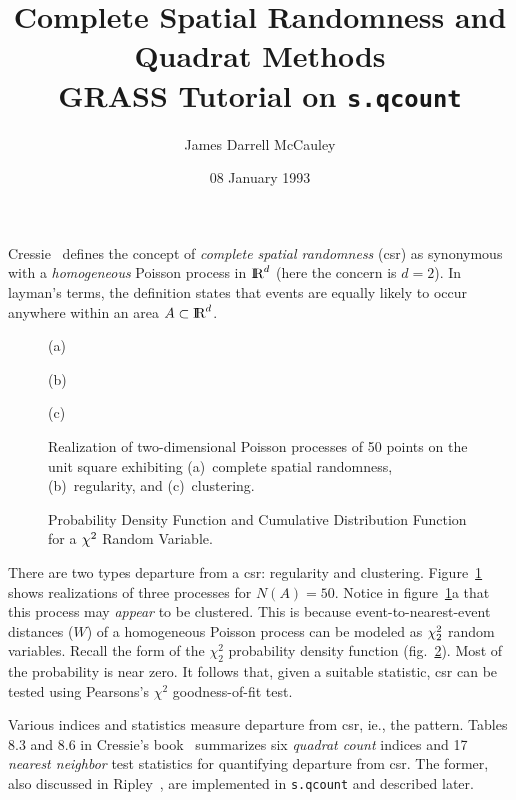 \title{Complete Spatial Randomness and Quadrat Methods\\ 
{\large GRASS Tutorial on {\tt s.qcount}}}
\author{James Darrell McCauley}
\date{08 January 1993}
\newcommand{\RR}{\mbox{\protect\makebox[.15em][l]{I}R}}


\maketitle
Cressie~\cite{cressie91} defines the concept of {\em
complete spatial randomness\/} (csr) as synonymous
with a {\em homogeneous\/} Poisson process in
$\RR^d\/$ (here the concern is $d=2$). In layman's
terms, the definition states that events are equally
likely to occur anywhere within an area
$A\subset\RR^d$.

\begin{figure}[h]
\begin{center}

\centerline{(a)}

\centerline{(b)}

\centerline{(c)}
\end{center}
\caption{Realization of two-dimensional Poisson processes of 50
points on the unit square exhibiting (a)~complete
spatial randomness, (b)~regularity, and (c)~clustering.}
\label{fig:csr}
\end{figure}

\begin{figure}[h]
\begin{center}

\end{center}
\caption{Probability Density Function and Cumulative Distribution
Function for a $\chi^2\/$ Random Variable.}
\label{fig:chisq}
\end{figure}

There are two types departure from a csr: regularity
and clustering.  Figure~\ref{fig:csr} shows
realizations of three processes for $N\left(A\right) =
50.$ Notice in figure~\ref{fig:csr}a that this
process may {\em appear\/} to be clustered.
This is because event-to-nearest-event distances ($W$) of
a homogeneous Poisson process can be modeled
as $\chi_2^2\/$ random variables. Recall the form of
the $\chi_2^2$ probability density function
(fig.~\ref{fig:chisq}). Most of the probability
is near zero. It follows that, given a suitable statistic,
csr can be tested using Pearsons's $\chi^2$ goodness-of-fit test.

Various indices and statistics
measure departure from csr, ie., the pattern.
Tables 8.3 and 8.6 in
Cressie's book~\cite{cressie91} summarizes six {\em
quadrat count\/} indices and 17 {\em nearest
neighbor\/} test statistics for quantifying
departure from csr.   The former,  also discussed
in Ripley~\cite{ripley81}, are implemented
in {\tt s.qcount} and described later.

